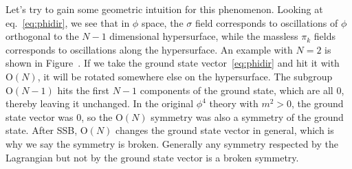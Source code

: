 Let's try to gain some geometric intuition for this phenomenon. 
Looking at eq.~\eqref{eq:phidir}, we see that in $\phi$ space, the $\sigma$
field corresponds to oscillations of $\phi$ orthogonal to the $N-1$
dimensional hypersurface, while the massless $\pi_k$ fields
corresponds to oscillations along the hypersurface. 
An example with $N=2$ is shown in Figure~. 
If we take the ground state vector~\eqref{eq:phidir} and hit it with
$\text{O}(N)$, it will be rotated somewhere else on the hypersurface.
The subgroup $\text{O}(N-1)$ hits the first $N-1$ components of the
ground state, which are all 0, thereby leaving it unchanged.
In the original $\phi^4$ theory with
$m^2>0$, the ground state vector was 0, so the $\text{O}(N)$ symmetry
was also a symmetry of the ground state. After SSB, $\text{O}(N)$ changes 
the ground state vector in general,
which is why we say the symmetry is broken. Generally any symmetry
respected by the Lagrangian but not by the ground state vector
is a broken symmetry.

